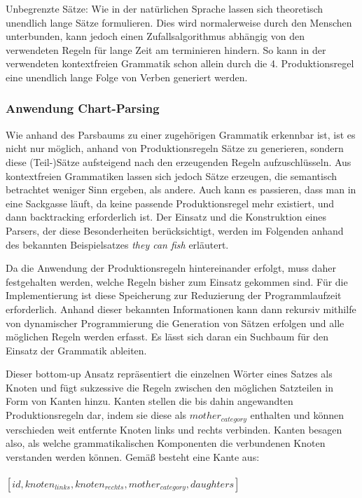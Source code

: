 \documentclass[12pt]{paper}
\begin{document}
Unbegrenzte Sätze: Wie in der natürlichen Sprache lassen sich theoretisch unendlich lange Sätze formulieren. Dies wird normalerweise durch den Menschen unterbunden, kann jedoch einen Zufallsalgorithmus abhängig von den verwendeten Regeln für lange Zeit am terminieren hindern. So kann in der verwendeten kontextfreien Grammatik schon allein durch die 4. Produktionsregel eine unendlich lange Folge von Verben generiert werden.

\subsubsection{Anwendung Chart-Parsing}
Wie anhand des Parsbaums zu einer zugehörigen Grammatik erkennbar ist, ist es nicht nur möglich, anhand von Produktionsregeln Sätze zu generieren, sondern diese (Teil-)Sätze aufsteigend nach den erzeugenden Regeln aufzuschlüsseln. Aus kontextfreien Grammatiken lassen sich jedoch Sätze erzeugen, die semantisch betrachtet weniger Sinn ergeben, als andere. Auch kann es passieren, dass man in eine Sackgasse läuft, da keine passende Produktionsregel mehr existiert, und dann backtracking erforderlich ist. Der Einsatz und die Konstruktion eines Parsers, der diese Besonderheiten berücksichtigt, werden im Folgenden anhand des bekannten Beispielsatzes \textit{they can fish} erläutert.

Da die Anwendung der Produktionsregeln hintereinander erfolgt, muss daher festgehalten werden, welche Regeln bisher zum Einsatz gekommen sind. Für die Implementierung ist diese Speicherung zur Reduzierung der Programmlaufzeit erforderlich. Anhand dieser bekannten Informationen kann dann rekursiv mithilfe von dynamischer Programmierung die Generation von Sätzen erfolgen und alle möglichen Regeln werden erfasst. Es lässt sich daran ein Suchbaum für den Einsatz der Grammatik ableiten. 

Dieser bottom-up Ansatz repräsentiert die einzelnen Wörter eines Satzes als Knoten und fügt sukzessive die Regeln zwischen den möglichen Satzteilen in Form von Kanten hinzu. Kanten stellen die bis dahin angewandten Produktionsregeln dar, indem sie diese als \textit{$mother_{category}$} enthalten und können verschieden weit entfernte Knoten links und rechts verbinden. Kanten besagen also, als welche grammatikalischen Komponenten die verbundenen Knoten verstanden werden können. Gemäß \cite{cop04} besteht eine Kante aus:
\\
\tt
\\$[id, knoten_{links}, knoten_{rechts}, mother_{category}, daughters]$
\rm
\\
\end{document}
